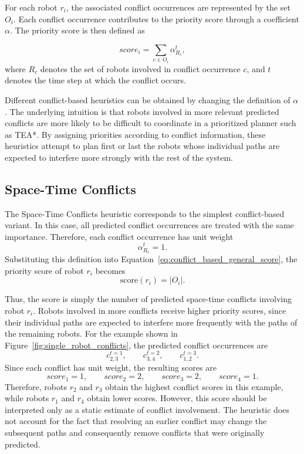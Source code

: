 For each robot \(r_i\), the associated conflict occurrences are represented by the set \(O_i\). Each conflict occurrence contributes to the priority score through a coefficient \(\alpha\). The priority score is then defined as

\begin{equation}
    score_i
    =
    \sum_{c \in O_i} \alpha^{t}_{R_c},
    \label{eq:conflict_based_general_score}
\end{equation}
where \(R_c\) denotes the set of robots involved in conflict occurrence \(c\), and \(t\) denotes the time step at which the conflict occurs.

Different conflict-based heuristics can be obtained by changing the definition of \(\alpha\). The underlying intuition is that robots involved in more relevant predicted conflicts are more likely to be difficult to coordinate in a prioritized planner such as TEA*. By assigning priorities according to conflict information, these heuristics attempt to plan first or last the robots whose individual paths are expected to interfere more strongly with the rest of the system.

\subsection{Space-Time Conflicts}
\label{subsec:space_time_conflicts}
\hspace{\parindent}
The Space-Time Conflicts heuristic corresponds to the simplest conflict-based variant. In this case, all predicted conflict occurrences are treated with the same importance. Therefore, each conflict occurrence has unit weight
\begin{equation}
    \alpha^{t}_{R_c} = 1.
\end{equation}
Substituting this definition into Equation~\ref{eq:conflict_based_general_score}, the priority score of robot $r_i$ becomes
\begin{equation}
    \mathrm{score}(r_i)
    =
    |O_i|.
\end{equation}

Thus, the score is simply the number of predicted space-time conflicts involving robot $r_i$. Robots involved in more conflicts receive higher priority scores, since their individual paths are expected to interfere more frequently with the paths of the remaining robots.
For the example shown in Figure~\ref{fig:single_robot_conflicts}, the predicted conflict occurrences are
\[
    c_{2,3}^{t=1}, \qquad
    c_{3,4}^{t=2}, \qquad
    c_{1,2}^{t=3}.
\]
Since each conflict has unit weight, the resulting scores are
\[
    score_1 = 1, \qquad
    score_2 = 2, \qquad
    score_3 = 2, \qquad
    score_4 = 1.
\]
Therefore, robots \(r_2\) and \(r_3\) obtain the highest conflict scores in this example, while robots \(r_1\) and \(r_4\) obtain lower scores. However, this score should be interpreted only as a static estimate of conflict involvement. The heuristic does not account for the fact that resolving an earlier conflict may change the subsequent paths and consequently remove conflicts that were originally predicted.


